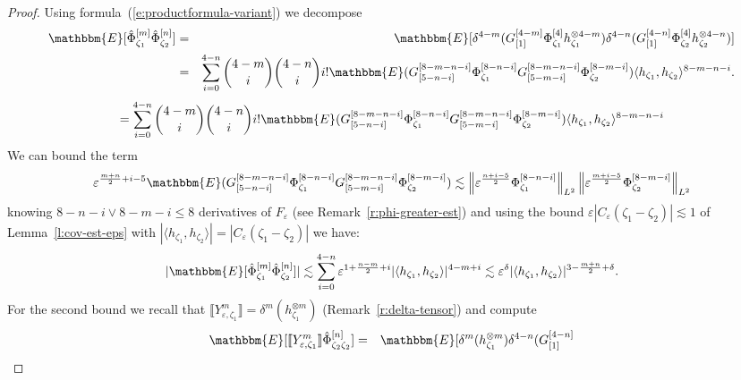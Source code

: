 \begin{proof}
  Using formula~(\ref{e:productformula-variant}) we decompose
  \begin{eqnarray*}
    \mathbbm{E} [\hat{\Phi}^{[m]}_{\zeta_1} \hat{\Phi}^{[n]}_{\zeta_2}] & = &
    \mathbbm{E} [\delta^{4 - m} (G_{[1]}^{[4 - m]} \Phi^{[4]}_{\zeta_1}
    h_{\zeta_1}^{\otimes 4 - m}) \delta^{4 - n} (G_{[1]}^{[4 - n]}
    \Phi^{[4]}_{\zeta_2} h_{\zeta_2}^{\otimes 4 - n})]\\
    & = & \sum_{i = 0}^{4 - n} \binom{4 - m}{i} \binom{4 - n}{i}
    i!\mathbbm{E} (G_{[5 - n - i]}^{[8 - m - n - i]} \Phi_{\zeta_1}^{[8 - n -
    i]} G_{[5 - m - i]}^{[8 - m - n - i]} \Phi^{[8 - m - i]}_{\zeta_2})
    \langle h_{\zeta_1}, h_{\zeta_2} \rangle^{8 - m - n - i} .
  \end{eqnarray*}
  \[ = \sum_{i = 0}^{4 - n} \binom{4 - m}{i} \binom{4 - n}{i} i!\mathbbm{E}
     (G_{[5 - n - i]}^{[8 - m - n - i]} \Phi_{\zeta_1}^{[8 - n - i]} G_{[5 - m
     - i]}^{[8 - m - n - i]} \Phi^{[8 - m - i]}_{\zeta_2}) \langle
     h_{\zeta_1}, h_{\zeta_2} \rangle^{8 - m - n - i} \]
  We can bound the term
  \[ \varepsilon^{\frac{m + n}{2} + i - 5} \mathbbm{E} (G_{[5 - n - i]}^{[8 -
     m - n - i]} \Phi_{\zeta_1}^{[8 - n - i]} G_{[5 - m - i]}^{[8 - m - n -
     i]} \Phi^{[8 - m - i]}_{\zeta_2}) \lesssim \left\| \varepsilon^{\frac{n +
     i - 5}{2}} \Phi_{\zeta_1}^{[8 - n - i]} \right\|_{L^2} \left\|
     \varepsilon^{\frac{m + i - 5}{2}} \Phi_{\zeta_2}^{[8 - m - i]}
     \right\|_{L^2} \]
  knowing $8 - n - i \vee 8 - m - i \leqslant 8$ derivatives of
  $F_{\varepsilon}$ (see Remark~\ref{r:phi-greater-est}) and using the bound
  $\varepsilon | C_{\varepsilon} (\zeta_1 - \zeta_2) | \lesssim 1$ of
  Lemma~\ref{l:cov-est-eps} with $| \langle h_{\zeta_1}, h_{\zeta_2} \rangle |
  = | C_{\varepsilon} (\zeta_1 - \zeta_2) |$ we have:
  \[ | \mathbbm{E} [\hat{\Phi}^{[m]}_{\zeta_1} \hat{\Phi}^{[n]}_{\zeta_2}] |
     \lesssim \sum_{i = 0}^{4 - n} \varepsilon^{1 + \frac{n - m}{2} + i} |
     \langle h_{\zeta_1}, h_{\zeta_2} \rangle |^{4 - m + i} \lesssim
     \varepsilon^{\delta} | \langle h_{\zeta_1}, h_{\zeta_2} \rangle |^{3 -
     \frac{m + n}{2} + \delta} . \]
  For the second bound we recall that $\llbracket Y^m_{\varepsilon, \zeta_1}
  \rrbracket = \delta^m (h_{\zeta_1}^{\otimes m})$
  (Remark~\ref{r:delta-tensor}) and compute
  \begin{eqnarray*}
    \mathbbm{E} [\llbracket Y^m_{\varepsilon, \zeta_1} \rrbracket
    \hat{\Phi}^{[n]}_{\zeta_2 \zeta_2}] & = & \mathbbm{E} [\delta^m
    (h_{\zeta_1}^{\otimes m}) \delta^{4 - n} (G_{[1]}^{[4 - n]}

\end{eqnarray*}
\end{proof}
